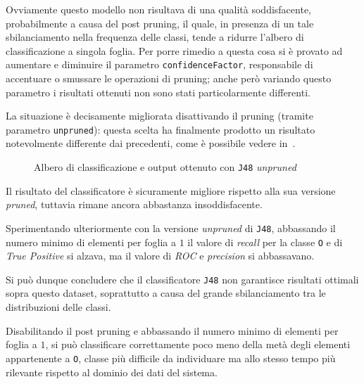 Ovviamente questo modello non risultava di una qualità soddisfacente, probabilmente a causa del post pruning,
il quale, in presenza di un tale sbilanciamento nella frequenza delle classi, tende a ridurre l'albero di classificazione a singola foglia.
Per porre rimedio a questa cosa si è provato ad aumentare e diminuire  il parametro \texttt{confidenceFactor}, responsabile di accentuare o smussare le operazioni di pruning;
anche però variando questo parametro i risultati ottenuti non sono stati particolarmente differenti.

La situazione è decisamente migliorata disattivando il pruning (tramite parametro \texttt{unpruned}):
questa scelta ha finalmente prodotto un risultato notevolmente differente dai precedenti, come è possibile vedere in~.

\begin{figure}[H]
  \centering
  \begin{subfigure}{0.35\textwidth}
    \centering
    \label{fig:j48-unpruned:tree}
  \end{subfigure}
  \hfill
  \begin{subfigure}{0.6\textwidth}
    \centering
    \label{subfig:j48-unpruned:result}
  \end{subfigure}
  \caption{Albero di classificazione e output ottenuto con \texttt{J48} \emph{unpruned}}%
  \label{fig:j48-unpruned}
\end{figure}

Il risultato del classificatore è sicuramente migliore rispetto alla sua versione \emph{pruned}, tuttavia rimane ancora abbastanza insoddisfacente.

Sperimentando ulteriormente con la versione \emph{unpruned} di \texttt{J48},
abbassando il numero minimo di elementi per foglia a \(1\) il valore di \emph{recall} per la classe \texttt{O} e di \emph{True Positive} si alzava,
ma il valore di \emph{ROC} e \emph{precision} si abbassavano.

Si può dunque concludere che il classificatore \texttt{J48} non garantisce risultati ottimali sopra questo dataset, soprattutto a causa del grande sbilanciamento tra le distribuzioni delle classi.

Disabilitando il post pruning e abbassando il numero minimo di elementi per foglia a \(1\), si può classificare correttamente poco meno della metà degli elementi appartenente a \texttt{O},
classe più difficile da individuare ma allo stesso tempo più rilevante rispetto al dominio dei dati del sistema.


